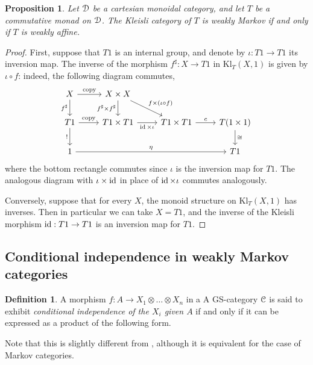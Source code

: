 \documentclass[a4paper,UKenglish,numberwithinsect,cleveref, autoref, thm-restate]{lipics-v2021}
\theoremstyle{plain} %
\newtheorem{myproposition}[mytheorem]{Proposition}
\theoremstyle{definition} %
\newtheorem{mydefinition}[mytheorem]{Definition}
\begin{document}
\begin{myproposition}\label{weaklyboth}
 Let $\mathcal{D}$ be a cartesian monoidal category, and let $T$ be a commutative monad on $\mathcal{D}$. The Kleisli category of $T$ is weakly Markov if and only if $T$ is weakly affine.
\end{myproposition}
\begin{proof}
 First, suppose that $T1$ is an internal group, and denote by $\iota:T1\to T1$ its inversion map. 
 The inverse of the morphism $f^\sharp:X\to T1$ in $\mathrm{Kl}_T(X,1)$ is given by $\iota\circ f$: indeed, the following diagram commutes,
 \[
  \begin{tikzcd}
  X \ar{d}[swap]{f^\sharp} \ar{r}{\mathrm{copy}} & X\times X \ar{d}[swap]{f^\sharp\times f^\sharp} \ar{dr}{f\times(\iota\circ f)} \\
  T1 \ar{d}[swap]{!} \ar{r}{\mathrm{copy}} & T1\times T1 \ar{r}[swap]{\id\times\iota} & T1\times T1 \ar{r}{c} & T(1\times 1) \ar{d}{\cong} \\
  1 \ar{rrr}{\eta} &&& T1
  \end{tikzcd}
 \]
 where the bottom rectangle commutes since $\iota$ is the inversion map for $T1$. The analogous diagram with $\iota\times\operatorname{ id}$ in place of $\operatorname{ id}\times\iota$ commutes analogously.
 
 Conversely, suppose that for every $X$, the monoid structure on $\mathrm{Kl}_T(X,1)$ has inverses. Then in particular we can take $X=T1$, and the inverse of the Kleisli morphism $\operatorname{ id}:T1\to T1$ is an inversion map for $T1$. 
\end{proof}



\subsection{Conditional independence in weakly Markov categories}

\begin{mydefinition}\label{defcondind}
 A morphism $f:A\to X_1\otimes\dots\otimes X_n$ in a A GS-category $\mathcal{C}$ is said to exhibit \emph{conditional independence of the $X_i$ given $A$} if and only if it can be expressed as a product of the following form.
\end{mydefinition}

Note that this is slightly different from \cite[Definition~6.6]{cho_jacobs_2019}, although it is equivalent for the case of Markov categories.
\end{document}
